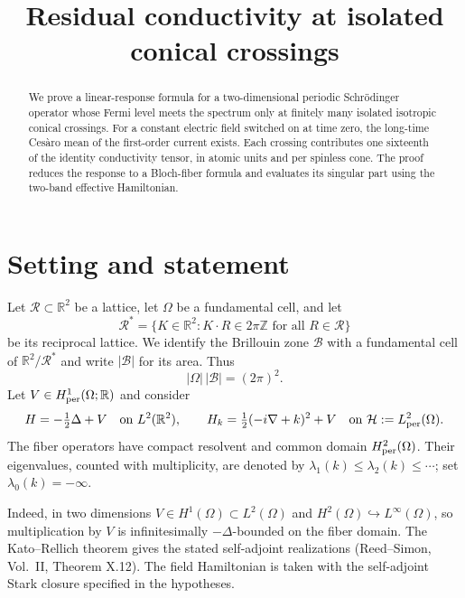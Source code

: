 \documentclass[11pt,a4paper]{article}
\title{Residual conductivity at isolated conical crossings}
\author{}
\date{}
\newcommand{\R}{\mathbb R}
\newcommand{\BZ}{\mathcal B}
\newcommand{\cH}{\mathcal H}
\begin{document}
\maketitle

\begin{abstract}
We prove a linear-response formula for a two-dimensional periodic Schr\"odinger
operator whose Fermi level meets the spectrum only at finitely many isolated
isotropic conical crossings. For a constant electric field switched on at time
zero, the long-time Ces\`aro mean of the first-order current exists. Each
crossing contributes one sixteenth of the identity conductivity tensor, in
atomic units and per spinless cone. The proof reduces the response to a
Bloch-fiber formula and evaluates its singular part using the two-band
effective Hamiltonian.
\end{abstract}

\section{Setting and statement}

Let $\mathcal R\subset\R^2$ be a lattice, let $\Omega$ be a fundamental cell,
and let
\[
 \mathcal R^*=\{K\in\R^2:K\cdot R\in2\pi\mathbb Z\text{ for all }R\in\mathcal R\}
\]
be its reciprocal lattice. We identify the Brillouin zone $\BZ$ with a
fundamental cell of $\R^2/\mathcal R^*$ and write $|\BZ|$ for its area. Thus
\begin{equation}\label{eq:area}
 |\Omega|\,|\BZ|=(2\pi)^2.
\end{equation}
Let $V\in H^1_{\rm per}(\Omega;\R)$ and consider
\[
 H=-\tfrac12\Delta+V\quad\text{on }L^2(\R^2),\qquad
 H_k=\tfrac12(-i\nabla+k)^2+V\quad\text{on }\cH:=L^2_{\rm per}(\Omega).
\]
The fiber operators have compact resolvent and common domain
$H^2_{\rm per}(\Omega)$. Their eigenvalues, counted with multiplicity, are
denoted by $\lambda_1(k)\leq\lambda_2(k)\leq\cdots$; set
$\lambda_0(k)=-\infty$.

Indeed, in two dimensions $V\in H^1(\Omega)\subset L^2(\Omega)$ and
$H^2(\Omega)\hookrightarrow L^\infty(\Omega)$, so multiplication by $V$ is
infinitesimally $-\Delta$-bounded on the fiber domain. The Kato--Rellich
theorem gives the stated self-adjoint realizations (Reed--Simon, Vol.~II,
Theorem X.12). The field Hamiltonian is taken with the self-adjoint Stark
closure specified in the hypotheses.
\end{document}

